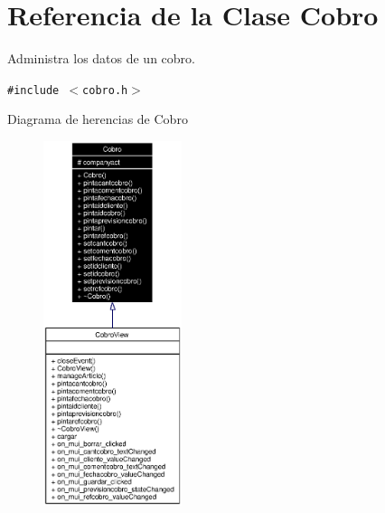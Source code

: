 \section{Referencia de la Clase Cobro}
\label{classCobro}
Administra los datos de un cobro.  


{\tt \#include $<$cobro.h$>$}

Diagrama de herencias de Cobro\begin{figure}[H]
\begin{center}
\leavevmode
\includegraphics[width=115pt]{classCobro__inherit__graph}
\end{center}
\end{figure}
